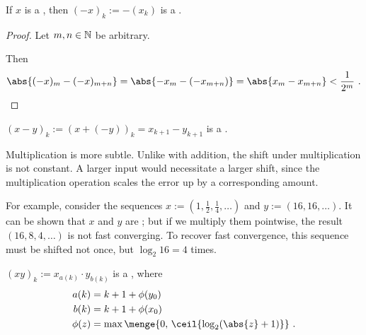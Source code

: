 \documentclass[leqno]{report}
\begin{document}
\begin{Proposition}[Negation]
    \label{neg}
    If $x$ is a \FCCS, then $(-x)_k := -(x_k)$ is a \FCCS.
\end{Proposition}

\begin{proof}
    Let $m, n \in \mathbb{N}$ be arbitrary.

    Then
    \[
        \abs{(-x)_m - (-x)_{m+n}}
        = \abs{-x_m - (-x_{m+n})}
        = \abs{x_m - x_{m+n}}
        < \frac{1}{2^m}
        \ . \qedhere
    \]
\end{proof}

\begin{Corollary}[Subtraction]
    $(x - y)_k := (x + (-y))_k = x_{k+1} - y_{k+1}$ is a \FCCS.
\end{Corollary}

Multiplication is more subtle. Unlike with addition, the shift under multiplication is not constant. A larger input would necessitate a larger shift, since the multiplication operation scales the error up by a corresponding amount.

For example, consider the sequences $x := (1, \frac{1}{2}, \frac{1}{4}, \ldots)$ and $y := (16, 16, \ldots)$. It can be shown that $x$ and $y$ are \FCCS; but if we multiply them pointwise, the result $(16, 8, 4, \ldots)$ is not fast converging. To recover fast convergence, this sequence must be shifted not once, but $\log_2 16 = 4$ times.

\begin{Proposition}[Multiplication]
    $(xy)_k := x_{a(k)} \cdot y_{b(k)}$ is a \FCCS, where
    \begin{align*}
        a(k) &= k + 1 + \phi(y_0) \\
        b(k) &= k + 1 + \phi(x_0) \\
        \phi(z) &= \max \menge{ 0,\, \ceil{\log_2(\abs{z} + 1)} }
        \ .
    \end{align*}
\end{Proposition}
\end{document}
